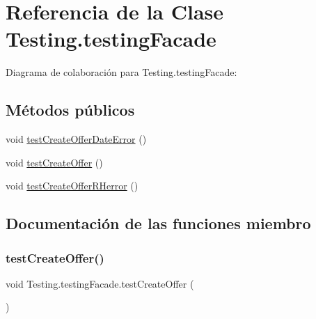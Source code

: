 \hypertarget{class_testing_1_1testing_facade}{}\section{Referencia de la Clase Testing.\+testing\+Facade}
\label{class_testing_1_1testing_facade}


Diagrama de colaboración para Testing.\+testing\+Facade\+:
\subsection*{Métodos públicos}
\begin{DoxyCompactItemize}
\item 
void \mbox{\hyperlink{class_testing_1_1testing_facade_a6b9459e014babee913e6931ca7f193bd}{test\+Create\+Offer\+Date\+Error}} ()
\item 
void \mbox{\hyperlink{class_testing_1_1testing_facade_a946dffccca05bf080e945a4787c940f3}{test\+Create\+Offer}} ()
\item 
void \mbox{\hyperlink{class_testing_1_1testing_facade_ad01314b0219294b8da854dd42f4e769b}{test\+Create\+Offer\+R\+Herror}} ()
\end{DoxyCompactItemize}


\subsection{Documentación de las funciones miembro}
\mbox{\label{class_testing_1_1testing_facade_a946dffccca05bf080e945a4787c940f3}} 
\subsubsection{\texorpdfstring{testCreateOffer()}{testCreateOffer()}}
{\footnotesize\ttfamily void Testing.\+testing\+Facade.\+test\+Create\+Offer (\begin{DoxyParamCaption}{ }\end{DoxyParamCaption})}

\mbox{\label{class_testing_1_1testing_facade_a6b9459e014babee913e6931ca7f193bd}} 
